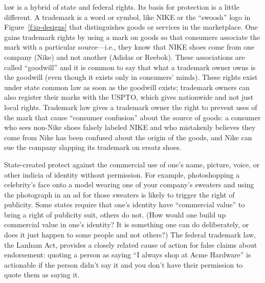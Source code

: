  law is a hybrid of state and federal rights. Its
basis for protection is a little different. A trademark is a word or symbol,
like NIKE or the ``swoosh'' logo in Figure~\ref{f:ip-designs}
that distinguishes goods or services in the
marketplace. One gains trademark rights by using a mark on goods so that
consumers associate the mark with a particular source---i.e., they know that
NIKE shoes come from one company (Nike) and not another (Adidas or Reebok).
These associations are called ``goodwill'' and it is common to say that what a
trademark owner owns is the goodwill (even though it exists only in consumers'
minds). These rights exist under state common law as soon as the goodwill
exists; trademark owners can also register their marks with the USPTO, which
gives nationwide and not just local rights. Trademark law gives a trademark
owner the right to prevent uses of the mark that cause ``consumer confusion''
about the source of goods: a consumer who sees non-Nike shoes falsely labeled
NIKE and who mistakenly believes they come from Nike has been confused about
the origin of the goods, and Nike can sue the company slapping its trademark on
ersatz shoes.

State-created  protect against the commercial use of one's
name, picture, voice, or other indicia  of identity without permission. For
example, photoshopping a celebrity's face onto a model wearing one of your
company's sweaters and using the photograph in an ad for those sweaters is
likely to trigger the right of publicity. Some states require that one's
identity have ``commercial value'' to bring a right of publicity suit, others
do not. (How would one build up commercial value in one's identity? It is
something one can do deliberately, or does it just happen to some people and
not others?) The federal trademark law, the Lanham Act, provides a closely
related cause of action for false claims about endorsement: quoting a person as
saying ``I always shop at Acme Hardware'' is actionable if the person didn't
say it and you don't have their permission to quote them as saying it.

